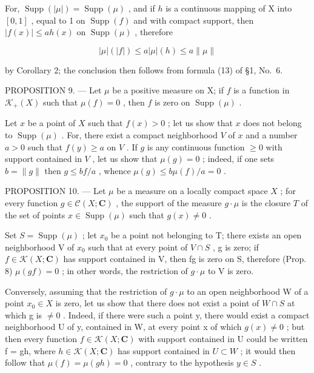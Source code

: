 For, \(\operatorname{Supp}(|\mu|) = \operatorname{Supp}(\mu)\) , and if \(h\) is a continuous mapping of X into \([0,1]\) , equal to 1 on \(\operatorname{Supp}(f)\) and with compact support, then \(|f(x)| \leqslant ah(x)\) on \(\operatorname{Supp}(\mu)\) , therefore

\[
| \mu | (| f |) \leqslant a | \mu | (h) \leqslant a \| \mu \|
\]

by Corollary 2; the conclusion then follows from formula (13) of §1, No.~6.

PROPOSITION 9. --- Let \(\mu\) be a positive measure on X; if \(f\) is a function in \(\mathcal{K}_{+}(X)\) such that \(\mu(f)=0\) , then \(f\) is zero on \(\operatorname{Supp}(\mu)\) .

Let \(x\) be a point of \(X\) such that \(f(x) > 0\) ; let us show that \(x\) does not belong to \(\operatorname{Supp}(\mu)\) . For, there exist a compact neighborhood \(V\) of \(x\) and a number \(a > 0\) such that \(f(y) \geqslant a\) on \(V\) . If \(g\) is any continuous function \(\geqslant 0\) with support contained in \(V\) , let us show that \(\mu(g) = 0\) ; indeed, if one sets \(b = \|g\|\) then \(g \leqslant bf/a\) , whence \(\mu(g) \leqslant b\mu(f)/a = 0\) .

PROPOSITION 10. --- Let \(\mu\) be a measure on a locally compact space \(X\) ; for every function \(g \in \mathcal{C}(X; \mathbf{C})\) , the support of the measure \(g \cdot \mu\) is the closure \(T\) of the set of points \(x \in \operatorname{Supp}(\mu)\) such that \(g(x) \neq 0\) .

Set \(S = \operatorname{Supp}(\mu)\) ; let \(x_{0}\) be a point not belonging to T; there exists an open neighborhood V of \(x_{0}\) such that at every point of \(V \cap S\) , g is zero; if \(f \in \mathcal{K}(X; \mathbf{C})\) has support contained in V, then fg is zero on S, therefore (Prop. 8) \(\mu(gf) = 0\) ; in other words, the restriction of \(g \cdot \mu\) to V is zero.

Conversely, assuming that the restriction of \(g \cdot \mu\) to an open neighborhood W of a point \(x_{0} \in X\) is zero, let us show that there does not exist a point of \(W \cap S\) at which g is \(\neq 0\) . Indeed, if there were such a point y, there would exist a compact neighborhood U of y, contained in W, at every point x of which \(g(x) \neq 0\) ; but then every function \(f \in \mathcal{K}(X; \mathbf{C})\) with support contained in U could be written f = gh, where \(h \in \mathcal{K}(X; \mathbf{C})\) has support contained in \(U \subset W\) ; it would then follow that \(\mu(f) = \mu(gh) = 0\) , contrary to the hypothesis \(y \in S\) .

